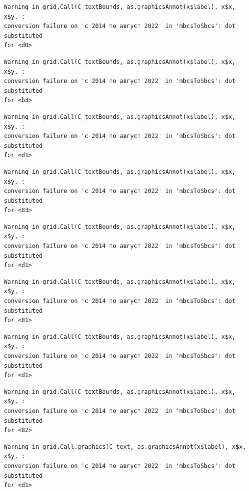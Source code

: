 \documentclass[
  letterpaper,
  DIV=11,
  numbers=noendperiod]{scrartcl}
\begin{document}
\begin{verbatim}
Warning in grid.Call(C_textBounds, as.graphicsAnnot(x$label), x$x, x$y, :
conversion failure on 'с 2014 по август 2022' in 'mbcsToSbcs': dot substituted
for <d0>
\end{verbatim}

\begin{verbatim}
Warning in grid.Call(C_textBounds, as.graphicsAnnot(x$label), x$x, x$y, :
conversion failure on 'с 2014 по август 2022' in 'mbcsToSbcs': dot substituted
for <b3>
\end{verbatim}

\begin{verbatim}
Warning in grid.Call(C_textBounds, as.graphicsAnnot(x$label), x$x, x$y, :
conversion failure on 'с 2014 по август 2022' in 'mbcsToSbcs': dot substituted
for <d1>
\end{verbatim}

\begin{verbatim}
Warning in grid.Call(C_textBounds, as.graphicsAnnot(x$label), x$x, x$y, :
conversion failure on 'с 2014 по август 2022' in 'mbcsToSbcs': dot substituted
for <83>
\end{verbatim}

\begin{verbatim}
Warning in grid.Call(C_textBounds, as.graphicsAnnot(x$label), x$x, x$y, :
conversion failure on 'с 2014 по август 2022' in 'mbcsToSbcs': dot substituted
for <d1>
\end{verbatim}

\begin{verbatim}
Warning in grid.Call(C_textBounds, as.graphicsAnnot(x$label), x$x, x$y, :
conversion failure on 'с 2014 по август 2022' in 'mbcsToSbcs': dot substituted
for <81>
\end{verbatim}

\begin{verbatim}
Warning in grid.Call(C_textBounds, as.graphicsAnnot(x$label), x$x, x$y, :
conversion failure on 'с 2014 по август 2022' in 'mbcsToSbcs': dot substituted
for <d1>
\end{verbatim}

\begin{verbatim}
Warning in grid.Call(C_textBounds, as.graphicsAnnot(x$label), x$x, x$y, :
conversion failure on 'с 2014 по август 2022' in 'mbcsToSbcs': dot substituted
for <82>
\end{verbatim}

\begin{verbatim}
Warning in grid.Call.graphics(C_text, as.graphicsAnnot(x$label), x$x, x$y, :
conversion failure on 'с 2014 по август 2022' in 'mbcsToSbcs': dot substituted
for <d1>
\end{verbatim}
\end{document}
